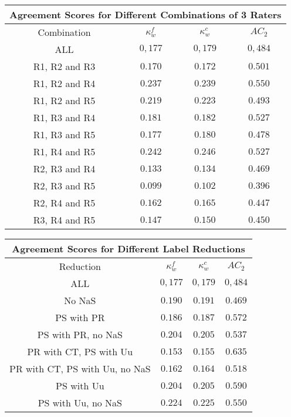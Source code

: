 \begin{minipage}{\linewidth}
\begin{tabular}{|c|c|c|c|}
\hline
\multicolumn{4}{|c|}{Agreement Scores for Different Combinations of 3 Raters}\\\hline
Combination &  $\kappa^{f}_{w}$ & $\kappa^{c}_{w}$ & $AC_2$\\\hline
ALL & $0,177$ & $0,179$ & $0,484$\\\hline
R1, R2 and R3 & $0.170$ & $0.172$ & $0.501$\\\hline
R1, R2 and R4 & $0.237$ & $0.239$ & $0.550$\\\hline
R1, R2 and R5 & $0.219$ & $0.223$ & $0.493$ \\\hline
R1, R3 and R4 & $0.181$ & $0.182$ & $0.527$ \\\hline
R1, R3 and R5 & $0.177$ & $0.180$ & $0.478$ \\\hline
R1, R4 and R5 & $0.242$ & $0.246$ & $0.527$ \\\hline
R2, R3 and R4 & $0.133$ & $0.134$ & $0.469$ \\\hline
R2, R3 and R5 & $0.099$ & $0.102$ & $0.396$ \\\hline
R2, R4 and R5 & $0.162$ & $0.165$ & $0.447$ \\\hline
R3, R4 and R5 & $0.147$ & $0.150$ & $0.450$\\\hline  
\end{tabular}
\end{minipage}
\newline
\newline
\newline
\begin{minipage}{\linewidth}
\begin{tabular}{|c|c|c|c|}
\hline
\multicolumn{4}{|c|}{Agreement Scores for Different Label Reductions}\\\hline
Reduction &  $\kappa^{f}_{w}$ & $\kappa^{c}_{w}$ & $AC_2$\\\hline
ALL & $0,177$ & $0,179$ & $0,484$\\\hline
No NaS & $0.190$ & $0.191$ & $0.469$ \\\hline
PS with PR & $0.186$ & $0.187$ & $0.572$\\\hline
PS with PR, no NaS & $0.204$ & $0.205$ & $0.537$\\\hline
PR with CT, PS with Uu & $0.153$ & $0.155$ & $0.635$\\\hline
PR with CT, PS with Uu, no NaS & $0.162$ & $0.164$ & $0.518$\\\hline
PS with Uu & $0.204$ & $0.205$ & $0.590$\\\hline
PS with Uu, no NaS & $0.224$ & $0.225$ & $0.550$\\\hline 
\end{tabular}
\end{minipage}

